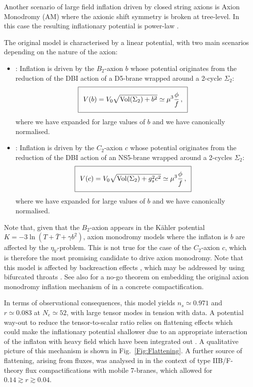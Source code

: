 Another scenario of large field inflation driven by closed string axions is Axion Monodromy (AM) where the axionic shift symmetry is broken at tree-level. In this case the resulting inflationary potential is power-law \cite{Silverstein:2008sg,McAllister:2008hb}. 

The original model is characterised by a linear potential, with two main scenarios depending on the nature of the axion: 
\begin{itemize}
\item {}: Inflation is driven by the $B_2$-axion $b$ whose potential originates from the reduction of the DBI action of a D5-brane wrapped around a 2-cycle $\Sigma_2$:
\begin{equation}
\setlength\fboxsep{0.25cm}
\setlength\fboxrule{0.4pt}
\boxed{
V (b) = V_0 \sqrt{{\rm Vol}(\Sigma_2) + b^2} \simeq \mu^3 \frac{\phi}{f}\,,
}
\end{equation}
where we have expanded for large values of $b$ and we have canonically normalised.

\item {}: Inflation is driven by the $C_2$-axion $c$ whose potential originates from the reduction of the DBI action of an NS5-brane wrapped around a 2-cycles $\Sigma_2$:
\begin{equation}
\setlength\fboxsep{0.25cm}
\setlength\fboxrule{0.4pt}
\boxed{
V (c) = V_0 \sqrt{{\rm Vol}(\Sigma_2) + g_s^2 c^2} \simeq \mu^3 \frac{\phi}{f}\,,
}
\label{VAxMon}
\end{equation}
where we have expanded for large values of $b$ and we have canonically normalised.
\end{itemize}
Note that, given that the $B_2$-axion appears in the K\"ahler potential $K = -3\ln\left(T+\bar{T}+\gamma b^2\right)$, axion monodromy models where the inflaton is $b$ are affected by the $\eta_V$-problem. This is not true for the case of the $C_2$-axion $c$, which is therefore the most promising candidate to drive axion monodromy. Note that this model is affected by backreaction effects \cite{Conlon:2011qp, Valenzuela:2016yny}, which may be addressed by using bifurcated throats \cite{Retolaza:2015sta}. 
%
See also \cite{Andriot:2015aza} for a no-go theorem on embedding  the original axion monodromy inflation mechanism of \cite{Silverstein:2008sg} in a concrete compactification.

In terms of observational consequences, this model yields $n_s\simeq 0.971$ and $r\simeq 0.083$ at $N_e\simeq 52$, with large tensor modes in tension with data. A potential way-out to reduce the tensor-to-scalar ratio relies on flattening effects which could make the inflationary potential shallower due to an appropriate interaction of the inflaton with heavy field which have been integrated out \cite{Dong:2010in}.    A qualitative picture of this mechanism is shown in Fig.~\ref{Fig:Flattening}. A further source of flattening, arising from fluxes, was analysed in \cite{Landete:2017amp} in the context of type IIB/F-theory flux compactifications with mobile 7-branes, which allowed for $0.14 \gtrsim r \gtrsim 0.04$.

